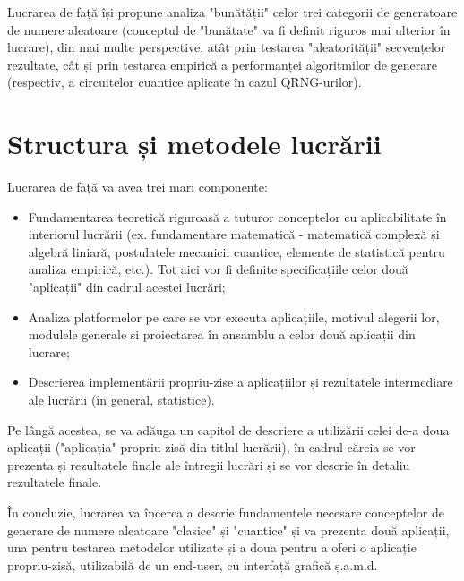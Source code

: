 Lucrarea de față își propune analiza "bunătății" celor trei categorii de generatoare de numere aleatoare (conceptul de "bunătate" va fi definit riguros mai ulterior în lucrare), din mai multe perspective, atât prin testarea "aleatorității" secvențelor rezultate, cât și prin testarea empirică a performanței algoritmilor de generare (respectiv, a circuitelor cuantice aplicate în cazul QRNG-urilor). 

\pagebreak

\section{Structura și metodele lucrării}
Lucrarea de față va avea trei mari componente:
\begin{itemize}
    \item Fundamentarea teoretică riguroasă a tuturor conceptelor cu aplicabilitate în interiorul lucrării (ex. fundamentare matematică - matematică complexă și algebră liniară, postulatele mecanicii cuantice, elemente de statistică pentru analiza empirică, etc.). Tot aici vor fi definite specificațiile celor două "aplicații" din cadrul acestei lucrări;
    \item Analiza platformelor pe care se vor executa aplicațiile, motivul alegerii lor, modulele generale și proiectarea în ansamblu a celor două aplicații din lucrare;
    \item Descrierea implementării propriu-zise a aplicațiilor și rezultatele intermediare ale lucrării (în general, statistice).
\end{itemize}

Pe lângă acestea, se va adăuga un capitol de descriere a utilizării celei de-a doua aplicații ("aplicația" propriu-zisă din titlul lucrării), în cadrul căreia se vor prezenta și rezultatele finale ale întregii lucrări și se vor descrie în detaliu rezultatele finale.


În concluzie, lucrarea va încerca a descrie fundamentele necesare conceptelor de generare de numere aleatoare "clasice" și "cuantice" și va prezenta două aplicații, una pentru testarea metodelor utilizate și a doua pentru a oferi o aplicație propriu-zisă, utilizabilă de un end-user, cu interfață grafică ș.a.m.d.




\renewcommand{\thesection}{\arabic{section}}
\renewcommand{\thesubsection}{\thesection.\arabic{subsection}}




